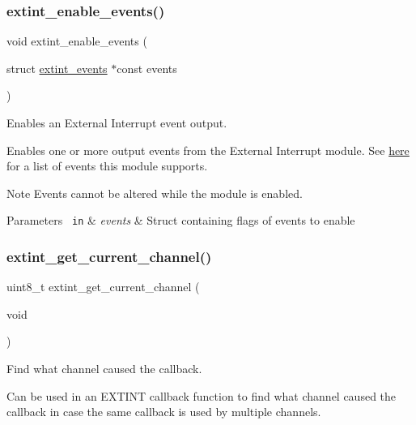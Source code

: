 \subsubsection{\texorpdfstring{extint\_enable\_events()}{extint\_enable\_events()}}
{\footnotesize\ttfamily void extint\+\_\+enable\+\_\+events (\begin{DoxyParamCaption}\item[{struct \mbox{\hyperlink{structextint__events}{extint\+\_\+events}} $\ast$const}]{events }\end{DoxyParamCaption})}



Enables an External Interrupt event output. 

Enables one or more output events from the External Interrupt module. See \mbox{\hyperlink{structextint__events}{here}} for a list of events this module supports.

\begin{DoxyNote}{Note}
Events cannot be altered while the module is enabled.
\end{DoxyNote}

\begin{DoxyParams}[1]{Parameters}
\mbox{\texttt{ in}}  & {\em events} & Struct containing flags of events to enable \\
\hline
\end{DoxyParams}
\mbox{\label{group__asfdoc__sam0__extint__group_ga1a7c8127569a9f83447f463bccd932a4}} 
\subsubsection{\texorpdfstring{extint\_get\_current\_channel()}{extint\_get\_current\_channel()}}
{\footnotesize\ttfamily uint8\+\_\+t extint\+\_\+get\+\_\+current\+\_\+channel (\begin{DoxyParamCaption}\item[{void}]{ }\end{DoxyParamCaption})}



Find what channel caused the callback. 

Can be used in an E\+X\+T\+I\+NT callback function to find what channel caused the callback in case the same callback is used by multiple channels.

